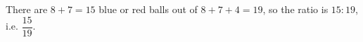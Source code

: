 There are $8+7=15$ blue or red balls out of $8+7+4=19$, so the ratio is $\boxed{15:19}$, i.e. $\dfrac{15}{19}$.
